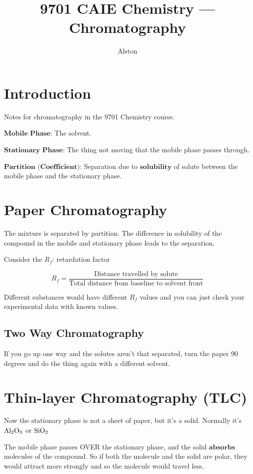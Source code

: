 \documentclass{article}
\title{9701 CAIE Chemistry — Chromatography}
\author{Alston}
\date{}
\theoremstyle{mytheoremstyle}
\theoremstyle{mytheoremstyle}
\theoremstyle{myproblemstyle}
\begin{document}
    \maketitle

    \section{Introduction}
    Notes for chromatography in the 9701 Chemistry course.


    $\textbf{Mobile Phase}$: The solvent.

    $\textbf{Stationary Phase}$: The thing not moving that the mobile phase passes through. 

    $\textbf{Partition (Coefficient)}$: Separation due to $\textbf{solubility}$ of solute between the mobile phase and the stationary phase.

    
    \section{Paper Chromatography}

    The mixture is separated by partition. The difference in solubility of the compound in the mobile and stationary phase leads to the separation.

    Consider the $R_f$: retardation factor

    \[R_f = \frac{\text{Distance travelled by solute}}{\text{Total distance from baseline to solvent front}}\]

    Different substances would have different $R_f$ values and you can just check your experimental data with known values.

    \subsection{Two Way Chromatography}
    If you go up one way and the solutes aren't that separated, turn the paper 90 degrees and do the thing again with a different solvent.

    
    \section{Thin-layer Chromatography (TLC)}
    Now the stationary phase is not a sheet of paper, but it's a solid. Normally it's $\ce{Al2O3}$ or $\ce{SiO2}$

    The mobile phase passes OVER the stationary phase, and the solid $\textbf{absorbs}$ molecules of the compound. So if both the molecule and the solid are polar, they would attract more strongly and so the molecule would travel less.
\end{document}
